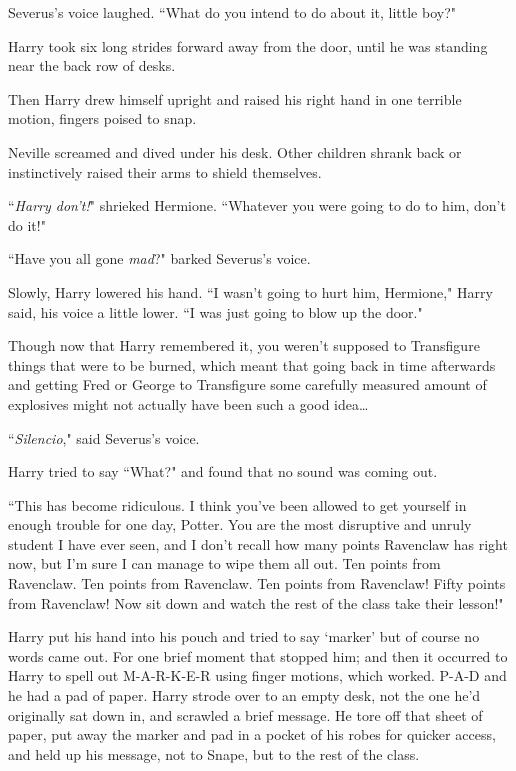 Severus's voice laughed. ``What do you intend to do about it, little boy?"

Harry took six long strides forward away from the door, until he was standing near the back row of desks.

Then Harry drew himself upright and raised his right hand in one terrible motion, fingers poised to snap.

Neville screamed and dived under his desk. Other children shrank back or instinctively raised their arms to shield themselves.

``\emph{Harry don't!}" shrieked Hermione. ``Whatever you were going to do to him, don't do it!"

``Have you all gone \emph{mad}?" barked Severus's voice.

Slowly, Harry lowered his hand. ``I wasn't going to hurt him, Hermione," Harry said, his voice a little lower. ``I was just going to blow up the door."

Though now that Harry remembered it, you weren't supposed to Transfigure things that were to be burned, which meant that going back in time afterwards and getting Fred or George to Transfigure some carefully measured amount of explosives might not actually have been such a good idea{\ldots}

``\emph{Silencio}," said Severus's voice.

Harry tried to say ``What?" and found that no sound was coming out.

``This has become ridiculous. I think you've been allowed to get yourself in enough trouble for one day, Potter. You are the most disruptive and unruly student I have ever seen, and I don't recall how many points Ravenclaw has right now, but I'm sure I can manage to wipe them all out. Ten points from Ravenclaw. Ten points from Ravenclaw. Ten points from Ravenclaw! Fifty points from Ravenclaw! Now sit down and watch the rest of the class take their lesson!"

Harry put his hand into his pouch and tried to say `marker' but of course no words came out. For one brief moment that stopped him; and then it occurred to Harry to spell out M-A-R-K-E-R using finger motions, which worked. P-A-D and he had a pad of paper. Harry strode over to an empty desk, not the one he'd originally sat down in, and scrawled a brief message. He tore off that sheet of paper, put away the marker and pad in a pocket of his robes for quicker access, and held up his message, not to Snape, but to the rest of the class.

